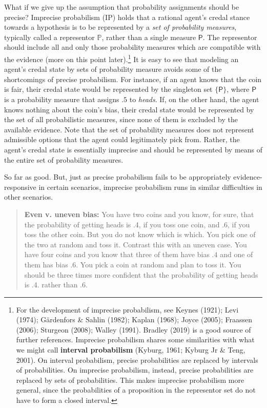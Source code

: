 \documentclass[
  letterpaper,
  DIV=11,
  numbers=noendperiod]{scrartcl}
\begin{document}
What if we give up the assumption that probability assignments should be
precise? Imprecise probabilism (\textsf{IP}) holds that a rational
agent's credal stance towards a hypothesis is to be represented by a
\emph{set of probability measures}, typically called a representor
\(\mathbb{P}\), rather than a single measure \(\mathsf{P}\). The
representor should include all and only those probability measures which
are compatible with the evidence (more on this point later).\footnote{For
  the development of imprecise probabilism, see Keynes (1921); Levi
  (1974); Gärdenfors \& Sahlin (1982); Kaplan (1968); Joyce (2005);
  Fraassen (2006); Sturgeon (2008); Walley (1991). Bradley (2019) is a
  good source of further references. Imprecise probabilism shares some
  similarities with what we might call \textbf{interval probabilism}
  (Kyburg, 1961; Kyburg Jr \& Teng, 2001). On interval probabilism,
  precise probabilities are replaced by intervals of probabilities. On
  imprecise probabilism, instead, precise probabilities are replaced by
  sets of probabilities. This makes imprecise probabilism more general,
  since the probabilities of a proposition in the representor set do not
  have to form a closed interval.} It is easy to see that modeling an
agent's credal state by sets of probability measure avoids some of the
shortcomings of precise probabilism. For instance, if an agent knows
that the coin is fair, their credal state would be represented by the
singleton set \(\{\mathsf{P}\}\), where \(\mathsf{P}\) is a probability
measure that assigns \(.5\) to \emph{heads}. If, on the other hand, the
agent knows nothing about the coin's bias, their credal state would be
represented by the set of all probabilistic measures, since none of them
is excluded by the available evidence. Note that the set of probability
measures does not represent admissible options that the agent could
legitimately pick from. Rather, the agent's credal state is essentially
imprecise and should be represented by means of the entire set of
probability measures.

So far as good. But, just as precise probabilism fails to be
appropriately evidence-responsive in certain scenarios, imprecise
probabilism runs in similar difficulties in other scenarios.

\begin{quote}
\textbf{Even v. uneven bias:}
 You have two coins and you know, for sure, that the probability of getting heads is .4, if you toss one coin, and .6, if you toss the other coin. But you do not know which is which. You pick one of the two at random and toss it.  Contrast this with an uneven case. You have four coins and you know that three of them have bias $.4$ and one of them has bias $.6$. You pick a coin at random and plan to toss it. You should be three times more confident that the probability of getting heads is .4. rather than .6.
\end{quote}
\end{document}
